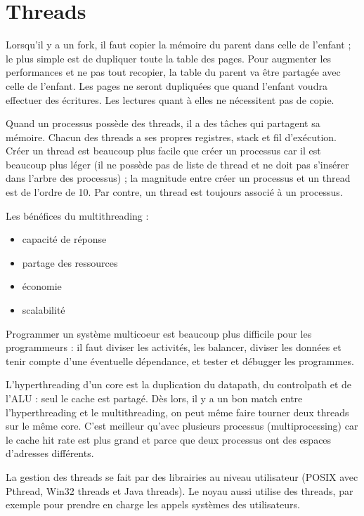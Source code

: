 \chapter{Threads}


Lorsqu'il y a un fork, il faut copier la mémoire du parent dans celle de l'enfant ; le plus simple est de dupliquer toute la table des pages. Pour augmenter les performances et ne pas tout recopier, la table du parent va être partagée avec celle de l'enfant. Les pages ne seront dupliquées que quand l'enfant voudra effectuer des écritures. Les lectures quant à elles ne nécessitent pas de copie.

Quand un processus possède des threads, il a des tâches qui partagent sa mémoire. Chacun des threads a ses propres registres, stack et fil d'exécution. Créer un thread est beaucoup plus facile que créer un processus car il est beaucoup plus léger (il ne possède pas de liste de thread et ne doit pas s'insérer dans l'arbre des processus) ; la magnitude entre créer un processus et un thread est de l'ordre de 10. Par contre, un thread est toujours associé à un processus.

Les bénéfices du multithreading :

\begin{itemize}
	\item capacité de réponse
	\item partage des ressources
	\item économie
	\item scalabilité
\end{itemize}

Programmer un système multicoeur est beaucoup plus difficile pour les programmeurs : il faut diviser les activités, les balancer, diviser les données et tenir compte d'une éventuelle dépendance, et tester et débugger les programmes.

L'hyperthreading d'un core est la duplication du datapath, du controlpath et de l'ALU : seul le cache est partagé. Dès lors, il y a un bon match entre l'hyperthreading et le multithreading, on peut même faire tourner deux threads sur le même core. C'est meilleur qu'avec plusieurs processus (multiprocessing)  car le cache hit rate est plus grand et parce que deux processus ont des espaces d'adresses différents.

La gestion des threads se fait par des librairies au niveau utilisateur (POSIX avec Pthread, Win32 threads et Java threads). Le noyau aussi utilise des threads, par exemple pour prendre en charge les appels systèmes des utilisateurs.

